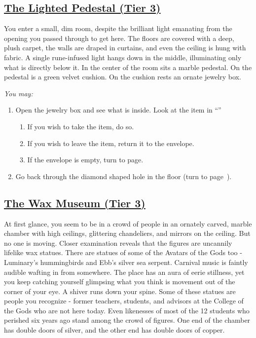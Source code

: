 \documentclass[sheet]{GL2020}
\begin{document}
\clearpage

\begin{center}\section*{\underline{The Lighted Pedestal (Tier 3)}}\end{center}
\label{LightedPedestal}

You enter a small, dim room, despite the brilliant light emanating from the opening you passed through to get here. The floors are covered with a deep, plush carpet, the walls are draped in curtains, and even the ceiling is hung with fabric. A single rune-infused light hangs down in the middle, illuminating only what is directly below it. In the center of the room sits a marble pedestal. On the pedestal is a green velvet cushion. On the cushion rests an ornate jewelry box. 

\vspace{0.5cm}

\begingroup
\itshape
You may:
\begin{enumerate}[A]
  \item Open the jewelry box and see what is inside. Look at the item in ``\sJewelryBoxEnvelope{}''
	\begin{enumerate}
		\item If you wish to take the item, do so.
		\item If you wish to leave the item, return it to the envelope.
		\item If the envelope is empty, turn to page\pageref{MemoryofLight}.
	\end{enumerate}
	\item Go back through the diamond shaped hole in the floor (turn to page~\pageref{TierThreeHub}).
\end{enumerate}
\endgroup

\clearpage

\begin{center}\section*{\underline{The Wax Museum (Tier 3)}}\end{center}
\label{WaxMuseum}

At first glance, you seem to be in a crowd of people in an ornately carved, marble chamber with high ceilings, glittering chandeliers, and mirrors on the ceiling. But no one is moving. Closer examination reveals that the figures are uncannily lifelike wax statues. There are statues of some of the Avatars of the Gods too - Luminary’s hummingbirds and Ebb’s silver sea serpent. Carnival music is faintly audible wafting in from somewhere. The place has an aura of eerie stillness, yet you keep catching yourself glimpsing what you think is movement out of the corner of your eye. A shiver runs down your spine. Some of these statues are people you recognize - former teachers, students, and advisors at the College of the Gods who are not here today. Even likenesses of most of the 12 students who perished six years ago stand among the crowd of figures. One end of the chamber has double doors of silver, and the other end has double doors of copper. 
\end{document}
